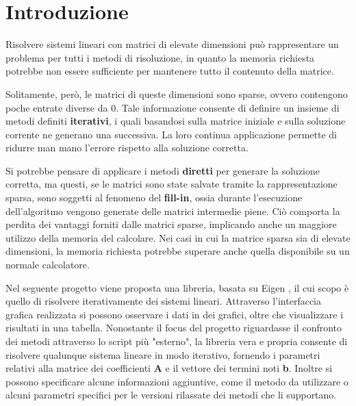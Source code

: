 \section{Introduzione}

Risolvere sistemi lineari con matrici di elevate dimensioni può rappresentare un problema per tutti i metodi di risoluzione, in quanto la memoria richiesta potrebbe non essere sufficiente per mantenere tutto il contenuto della matrice.

Solitamente, però, le matrici di queste dimensioni sono sparse, ovvero contengono poche entrate diverse da 0. Tale informazione consente di definire un insieme di metodi definiti \textbf{iterativi}, i quali basandosi sulla matrice iniziale e sulla soluzione corrente ne generano una successiva. La loro continua applicazione permette di ridurre man mano l'errore rispetto alla soluzione corretta.

Si potrebbe pensare di applicare i metodi \textbf{diretti} per generare la soluzione corretta, ma questi, se le matrici sono state salvate tramite la rappresentazione sparsa, sono soggetti al fenomeno del \textbf{fill-in}, ossia durante l'esecuzione dell'algoritmo vengono generate delle matrici intermedie piene. Ciò comporta la perdita dei vantaggi forniti dalle matrici sparse, implicando anche un maggiore utilizzo della memoria del calcolare. Nei casi in cui la matrice sparsa sia di elevate dimensioni, la memoria richiesta potrebbe superare anche quella disponibile su un normale calcolatore.
 
Nel seguente progetto viene proposta una libreria, basata su Eigen \cite{Eigen} , il cui scopo è quello di risolvere iterativamente dei sistemi lineari. Attraverso l'interfaccia grafica realizzata si possono osservare i dati in dei grafici, oltre che visualizzare i risultati in una tabella. Nonostante il focus del progetto riguardasse il confronto dei metodi attraverso lo script più "esterno", la libreria vera e propria consente di risolvere qualunque sistema lineare in modo iterativo, fornendo i parametri relativi alla matrice dei coefficienti \textbf{A} e il vettore dei termini noti \textbf{b}. Inoltre si possono specificare alcune informazioni aggiuntive, come il metodo da utilizzare o alcuni parametri specifici per le versioni rilassate dei metodi che li supportano.
 
 
 
